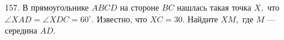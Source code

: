 157. В прямоугольнике $ABCD$ на стороне $BC$ нашлась такая точка $X,$ что $\angle XAD = \angle XDC = 60^\circ.$ Известно, что $XC = 30.$ Найдите $XM,$ где $M$ — середина $AD.$\\
